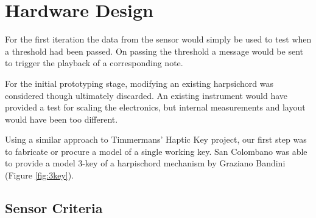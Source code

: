 






\section{Hardware Design}

For the first iteration the data from the sensor would simply be used to test when a threshold had been passed. On passing the threshold a message would be sent to trigger the playback of a corresponding note.

For the initial prototyping stage, modifying an existing harpsichord was considered though ultimately discarded. An existing instrument would
have provided a test for scaling the electronics, but internal measurements and layout would have been too different. 

Using a similar approach to Timmermans' Haptic Key project, \cite{Timmermans2020} our first step was to fabricate or procure a model of a single working key. San Colombano was able to provide a model 3-key of a harpischord mechanism by Graziano Bandini (Figure \ref{fig:3key}).

\subsection{Sensor Criteria}\label{sensor-criteria}

